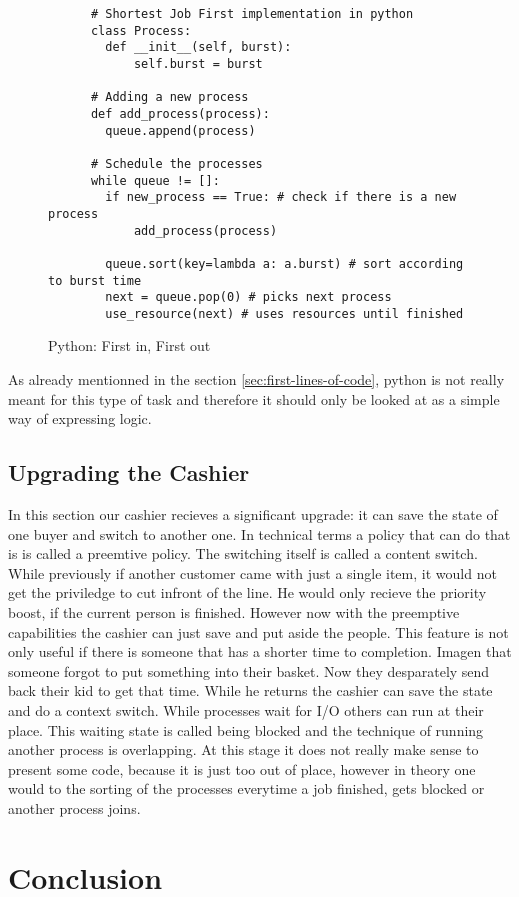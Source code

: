 \begin{figure}[h]
    \begin{verbatim}
      # Shortest Job First implementation in python
      class Process:
        def __init__(self, burst):
            self.burst = burst

      # Adding a new process
      def add_process(process):
        queue.append(process)

      # Schedule the processes
      while queue != []:
        if new_process == True: # check if there is a new process
            add_process(process)
        
        queue.sort(key=lambda a: a.burst) # sort according to burst time
        next = queue.pop(0) # picks next process
        use_resource(next) # uses resources until finished
    \end{verbatim}
    \label{code:sjf}
    \caption{Python: First in, First out}
\end{figure}

As already mentionned in the section \ref{sec:first-lines-of-code}, python is not really meant for this type of task and therefore it should only be looked at as a simple way of expressing logic.

\section{Upgrading the Cashier}

In this section our cashier recieves a significant upgrade: it can save the state of one buyer and switch to another one.
In technical terms a policy that can do that is is called a preemtive policy. 
The switching itself is called a content switch.
While previously if another customer came with just a single item, it would not get the priviledge to cut infront of the line. 
He would only recieve the priority boost, if the current person is finished.
However now with the preemptive capabilities the cashier can just save and put aside the people.
This feature is not only useful if there is someone that has a shorter time to completion.
Imagen that someone forgot to put something into their basket.
Now they desparately send back their kid to get that time. While he returns the cashier can save the state and do a context switch.
While processes wait for I/O others can run at their place.
This waiting state is called being blocked and the technique of running another process is overlapping.
At this stage it does not really make sense to present some code, because it is just too out of place, however in theory one would to the sorting of the processes everytime a job finished, gets blocked or another process joins.





\chapter{Conclusion}
